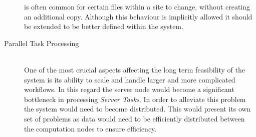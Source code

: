 \documentclass[12pt,a4paper]{report}
\begin{document}
\begin{description}
is often common for certain files within a site to change, without creating an
additional copy. Although this behaviour is implicitly allowed it should be
extended to be better defined within the system.
\item[Parallel Task Processing] \hfill \\
One of the most crucial aspects affecting the long term feasibility of the
system is its ability to scale and handle larger and more complicated workflows.
In this regard the server node would become a significant bottleneck in
processing \emph{Server Tasks}. In order to alleviate this problem the system
would need to become distributed. This would present its own set of problems
as data would need to be efficiently distributed between the computation nodes
to ensure efficiency. 

\end{description}

{}

%
\end{document}
